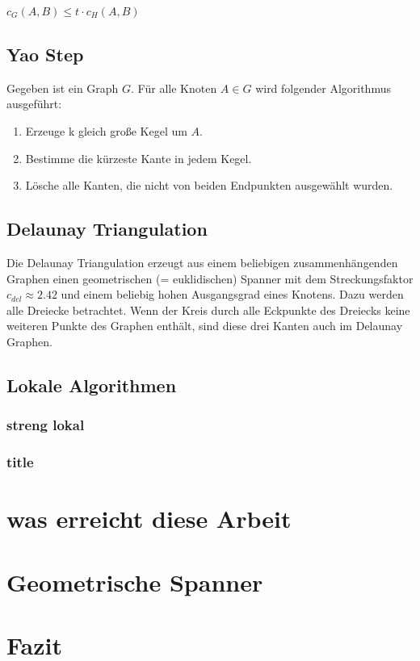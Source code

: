 \documentclass[a4paper,twoside]{IEEEtran}
\begin{document}
$c_G(A,B) \leq t \cdot c_H(A,B) $

\subsection{Yao Step}
Gegeben ist ein Graph $G $. Für alle Knoten $A \in G $ wird folgender Algorithmus ausgeführt:
\begin{enumerate}
\item Erzeuge k gleich große Kegel um $A $.
\item Bestimme die kürzeste Kante in jedem Kegel.
\item Lösche alle Kanten, die nicht von beiden Endpunkten ausgewählt wurden.

\end{enumerate} 

\subsection{Delaunay Triangulation}
Die Delaunay Triangulation erzeugt aus einem beliebigen zusammenhängenden Graphen einen geometrischen (= euklidischen) Spanner mit dem Streckungsfaktor $c_{del} \approx 2.42 $ und einem beliebig hohen Ausgangsgrad eines Knotens. Dazu werden alle Dreiecke betrachtet. Wenn der Kreis durch alle Eckpunkte des Dreiecks keine weiteren Punkte des Graphen enthält, sind diese drei Kanten auch im Delaunay Graphen.

\subsection{Lokale Algorithmen}
\subsubsection{streng lokal}
\subsubsection{title}


\section{was erreicht diese Arbeit} %

\section{Geometrische Spanner}
\section{Fazit}





\end{document}
